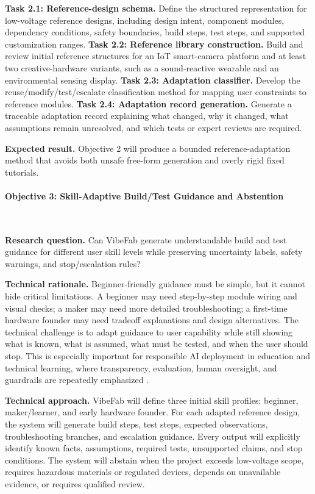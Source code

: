 \textbf{Task 2.1: Reference-design schema.} Define the structured representation for low-voltage reference designs, including design intent, component modules, dependency conditions, safety boundaries, build steps, test steps, and supported customization ranges.
\textbf{Task 2.2: Reference library construction.} Build and review initial reference structures for an IoT smart-camera platform and at least two creative-hardware variants, such as a sound-reactive wearable and an environmental sensing display.
\textbf{Task 2.3: Adaptation classifier.} Develop the reuse/modify/test/escalate classification method for mapping user constraints to reference modules.
\textbf{Task 2.4: Adaptation record generation.} Generate a traceable adaptation record explaining what changed, why it changed, what assumptions remain unresolved, and which tests or expert reviews are required.

\textbf{Expected result.} Objective 2 will produce a bounded reference-adaptation method that avoids both unsafe free-form generation and overly rigid fixed tutorials.

\vspace{-10pt}
\paragraph{Objective 3: Skill-Adaptive Build/Test Guidance and Abstention}~{}

\textbf{Research question.} Can VibeFab generate understandable build and test guidance for different user skill levels while preserving uncertainty labels, safety warnings, and stop/escalation rules?

\textbf{Technical rationale.} Beginner-friendly guidance must be simple, but it cannot hide critical limitations. A beginner may need step-by-step module wiring and visual checks; a maker may need more detailed troubleshooting; a first-time hardware founder may need tradeoff explanations and design alternatives. The technical challenge is to adapt guidance to user capability while still showing what is known, what is assumed, what must be tested, and when the user should stop. This is especially important for responsible AI deployment in education and technical learning, where transparency, evaluation, human oversight, and guardrails are repeatedly emphasized \cite{usdoe2023ai,unesco2023genai,nist2023airmf,nist2024genaiprofile,jurenka2024responsible,liffiton2023codehelp}.

\textbf{Technical approach.} VibeFab will define three initial skill profiles: beginner, maker/learner, and early hardware founder. For each adapted reference design, the system will generate build steps, test steps, expected observations, troubleshooting branches, and escalation guidance. Every output will explicitly identify known facts, assumptions, required tests, unsupported claims, and stop conditions. The system will abstain when the project exceeds low-voltage scope, requires hazardous materials or regulated devices, depends on unavailable evidence, or requires qualified review.


